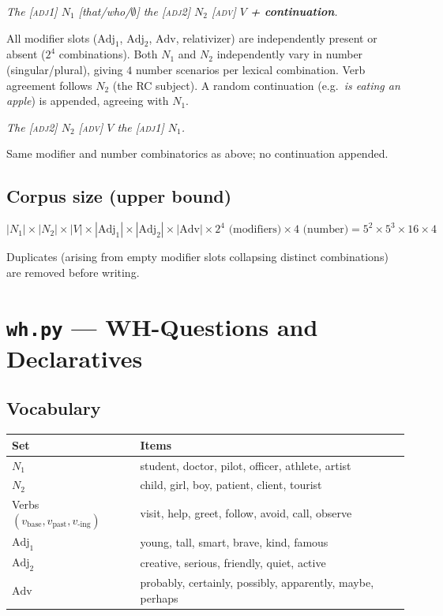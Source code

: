 \documentclass[11pt]{article}
\begin{document}
\begin{description}[leftmargin=2em]
  \item[1 --- ORC] \textit{The [\textsc{adj1}] $N_1$ [that/who/\(\emptyset\)] the [\textsc{adj2}] $N_2$ [\textsc{adv}] $V$ \textbf{+ continuation}.}

  All modifier slots ($\text{Adj}_1$, $\text{Adj}_2$, $\text{Adv}$, relativizer) are independently present or absent ($2^4$ combinations). Both $N_1$ and $N_2$ independently vary in number (singular/plural), giving $4$ number scenarios per lexical combination. Verb agreement follows $N_2$ (the RC subject). A random continuation (e.g.\ \textit{is eating an apple}) is appended, agreeing with $N_1$.

  \item[2 --- SVO] \textit{The [\textsc{adj2}] $N_2$ [\textsc{adv}] $V$ the [\textsc{adj1}] $N_1$.}

  Same modifier and number combinatorics as above; no continuation appended.
\end{description}

\subsection*{Corpus size (upper bound)}

\[
  |N_1| \times |N_2| \times |V| \times |\text{Adj}_1| \times |\text{Adj}_2| \times |\text{Adv}|
  \times 2^4 \text{ (modifiers)} \times 4 \text{ (number)} = 5^2 \times 5^3 \times 16 \times 4
\]

Duplicates (arising from empty modifier slots collapsing distinct combinations) are removed before writing.

\section*{\texttt{wh.py} --- WH-Questions and Declaratives}

\subsection*{Vocabulary}

\begin{tabular}{lp{9cm}}
\toprule
\textbf{Set} & \textbf{Items} \\
\midrule
$N_1$ & student, doctor, pilot, officer, athlete, artist \\
$N_2$ & child, girl, boy, patient, client, tourist \\
Verbs $(v_\text{base}, v_\text{past}, v_\text{-ing})$ & visit, help, greet, follow, avoid, call, observe \\
$\text{Adj}_1$ & young, tall, smart, brave, kind, famous \\
$\text{Adj}_2$ & creative, serious, friendly, quiet, active \\
$\text{Adv}$   & probably, certainly, possibly, apparently, maybe, perhaps \\
\bottomrule
\end{tabular}
\end{document}
